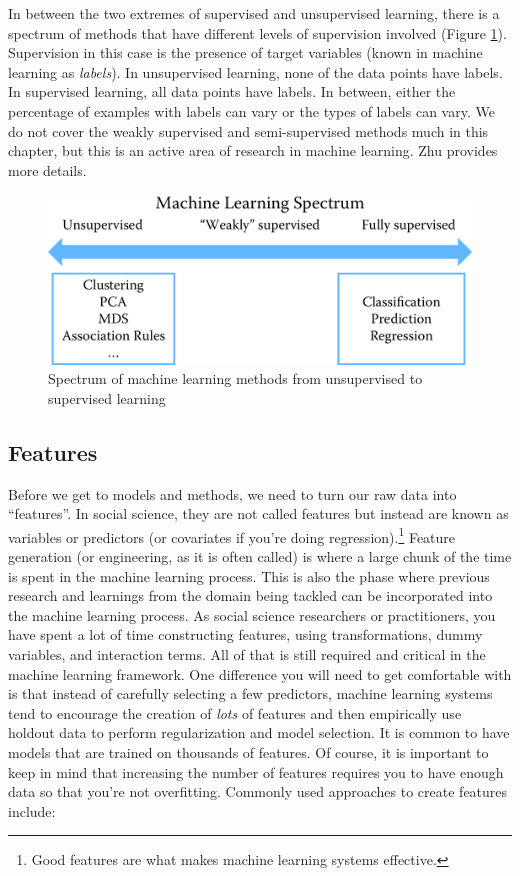 \documentclass[]{krantz}
\begin{document}
In between the two extremes of supervised and unsupervised learning,
there is a spectrum of methods that have different levels of supervision
involved (Figure \ref{fig:spectrum}). Supervision in this case is the
presence of target variables (known in machine learning as
\emph{labels}). In unsupervised learning, none of the data points have
labels. In supervised learning, all data points have labels. In between,
either the percentage of examples with labels can vary or the types of
labels can vary. We do not cover the weakly supervised and
semi-supervised methods much in this chapter, but this is an active area
of research in machine learning. Zhu \citeyearpar{zhu2005semi} provides
more details.

\begin{figure}

{\centering \includegraphics[width=0.7\linewidth]{ChapterML/figures/spectrum} 

}

\caption{Spectrum of machine learning methods from unsupervised to supervised learning}\label{fig:spectrum}
\end{figure}

\subsection{Features}\label{features}

Before we get to models and methods, we need to turn our raw data into
``features''. In social science, they are not called features but
instead are known as variables or predictors (or covariates if you're
doing regression).\footnote{Good features are what makes machine
  learning systems effective.} Feature generation (or engineering, as it
is often called) is where a large chunk of the time is spent in the
machine learning process. This is also the phase where previous research
and learnings from the domain being tackled can be incorporated into the
machine learning process. As social science researchers or
practitioners, you have spent a lot of time constructing features, using
transformations, dummy variables, and interaction terms. All of that is
still required and critical in the machine learning framework. One
difference you will need to get comfortable with is that instead of
carefully selecting a few predictors, machine learning systems tend to
encourage the creation of \emph{lots} of features and then empirically
use holdout data to perform regularization and model selection. It is
common to have models that are trained on thousands of features. Of
course, it is important to keep in mind that increasing the number of
features requires you to have enough data so that you're not
overfitting. Commonly used approaches to create features include:
\end{document}
